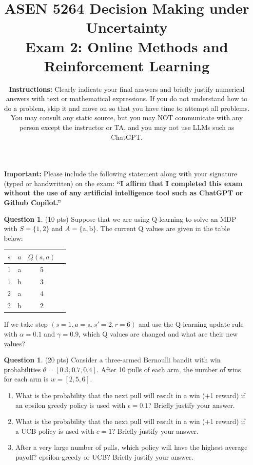 \documentclass{article}
\title{ASEN 5264 Decision Making under Uncertainty\\
       Exam 2: Online Methods and Reinforcement Learning}
\date{\small 
    \textbf{Instructions:} Clearly indicate your final answers and briefly justify numerical answers with text or mathematical expressions. If you do not understand how to do a problem, skip it and move on so that you have time to attempt all problems. You may consult any static source, but you may NOT communicate with any person except the instructor or TA, and you may not use LLMs such as ChatGPT.
}
\theoremstyle{definition}
\newtheorem{question}[thm]{Question}
\begin{document}
\maketitle

\noindent\textbf{Important:} Please include the following statement along with your signature (typed or handwritten) on the exam: \textbf{``I affirm that I completed this exam without the use of any artificial intelligence tool such as ChatGPT or Github Copilot.''}

\begin{question} (10 pts)
    Suppose that we are using Q-learning to solve an MDP with $S = \{1, 2\}$ and $A = \{\text{a}, \text{b}\}$. The current Q values are given in the table below:
    \begin{center}
        \begin{tabular}{cc|cc}
            \toprule
            $s$ & $a$ & $Q(s, a)$ \\
            \midrule
            1 & a & 5 \\
            1 & b & 3 \\
            2 & a & 4 \\
            2 & b & 2 \\
            \bottomrule
        \end{tabular}
    \end{center}
    If we take step $(s=1, a=\text{a}, s'=2, r=6)$ and use the Q-learning update rule with $\alpha = 0.1$ and $\gamma = 0.9$, which Q values are changed and what are their new values?
\end{question}


\clearpage

\begin{question} (20 pts)
    Consider a three-armed Bernoulli bandit with win probabilities $\theta = [0.3, 0.7, 0.4]$. After 10 pulls of each arm, the number of wins for each arm is $w = [2, 5, 6]$.
    \begin{enumerate}[label=(\alph*)]
        \item What is the probability that the next pull will result in a win (+1 reward) if an epsilon greedy policy is used with $\epsilon = 0.1$? Briefly justify your answer.
        \item What is the probability that the next pull will result in a win (+1 reward) if a UCB policy is used with $c = 1$? Briefly justify your answer.
        \item After a very large number of pulls, which policy will have the highest average payoff? epsilon-greedy or UCB? Briefly justify your answer.
    \end{enumerate}
\end{question}
\end{document}
